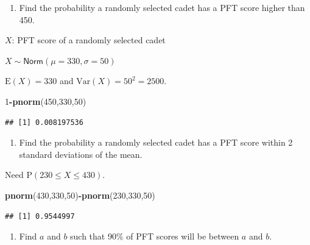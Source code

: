 \documentclass[
]{book}
\newenvironment{Shaded}{\begin{snugshade}}{\end{snugshade}}
\newcommand{\DecValTok}[1]{\textcolor[rgb]{0.00,0.00,0.81}{#1}}
\newcommand{\KeywordTok}[1]{\textcolor[rgb]{0.13,0.29,0.53}{\textbf{#1}}}
\newcommand{\NormalTok}[1]{#1}
\newcommand{\OperatorTok}[1]{\textcolor[rgb]{0.81,0.36,0.00}{\textbf{#1}}}
\providecommand{\tightlist}{%
  \setlength{\itemsep}{0pt}\setlength{\parskip}{0pt}}
\begin{document}
\begin{enumerate}
\def\labelenumi{\alph{enumi}.}
\tightlist
\item
  Find the probability a randomly selected cadet has a PFT score higher than 450.
\end{enumerate}

\(X\): PFT score of a randomly selected cadet

\(X\sim \textsf{Norm}(\mu=330,\sigma=50)\)

\(\mbox{E}(X) = 330\) and \(\mbox{Var}(X)=50^2=2500\).

\begin{Shaded}
\begin{Highlighting}[]
\DecValTok{1}\OperatorTok{-}\KeywordTok{pnorm}\NormalTok{(}\DecValTok{450}\NormalTok{,}\DecValTok{330}\NormalTok{,}\DecValTok{50}\NormalTok{)}
\end{Highlighting}
\end{Shaded}

\begin{verbatim}
## [1] 0.008197536
\end{verbatim}

\begin{enumerate}
\def\labelenumi{\alph{enumi}.}
\setcounter{enumi}{1}
\tightlist
\item
  Find the probability a randomly selected cadet has a PFT score within 2 standard deviations of the mean.
\end{enumerate}

Need \(\mbox{P}(230 \leq X \leq 430)\).

\begin{Shaded}
\begin{Highlighting}[]
\KeywordTok{pnorm}\NormalTok{(}\DecValTok{430}\NormalTok{,}\DecValTok{330}\NormalTok{,}\DecValTok{50}\NormalTok{)}\OperatorTok{-}\KeywordTok{pnorm}\NormalTok{(}\DecValTok{230}\NormalTok{,}\DecValTok{330}\NormalTok{,}\DecValTok{50}\NormalTok{)}
\end{Highlighting}
\end{Shaded}

\begin{verbatim}
## [1] 0.9544997
\end{verbatim}

\begin{enumerate}
\def\labelenumi{\alph{enumi}.}
\setcounter{enumi}{2}
\tightlist
\item
  Find \(a\) and \(b\) such that 90\% of PFT scores will be between \(a\) and \(b\).
\end{enumerate}
\end{document}
